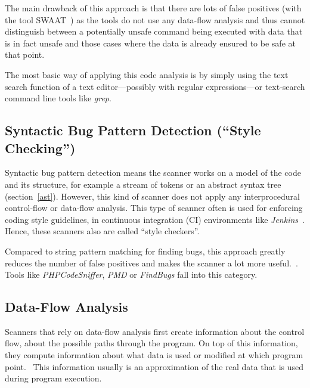The main drawback of this approach is that there are lots of false positives (\eg with the tool SWAAT~\cite{swaat}) as the tools do not use any data-flow analysis and thus cannot distinguish between a potentially unsafe command being executed with data that is in fact unsafe and those cases where the data is already ensured to be safe at that point.

The most basic way of applying this code analysis is by simply using the text search function of a text editor---possibly with regular expressions---or text-search command line tools like \emph{grep}.


\subsection{Syntactic Bug Pattern Detection (``Style Checking'')}

Syntactic bug pattern detection means the scanner works on a model of the code and its structure, for example a stream of tokens or an abstract syntax tree (section~\ref{ast}). However, this kind of scanner does not apply any interprocedural control-flow or data-flow analysis. This type of scanner often is used for enforcing coding style guidelines, \eg in continuous integration (CI) environments like \emph{Jenkins}~\cite{jenkins}. Hence, these scanners also are called ``style checkers''.

Compared to string pattern matching for finding bugs, this approach greatly reduces the number of false positives and makes the scanner a lot more useful.~\cite{comparison-of-bug-finding-tools}. Tools like \emph{PHPCodeSniffer}, \emph{PMD} or \emph{FindBugs} fall into this category.


\subsection{Data-Flow Analysis}

Scanners that rely on data-flow analysis first create information about the control flow, \ie about the possible paths through the program. On top of this information, they compute information about what data is used or modified at which program point.~\cite{data-flow-analysis} This information usually is an approximation of the real data that is used during program execution.

